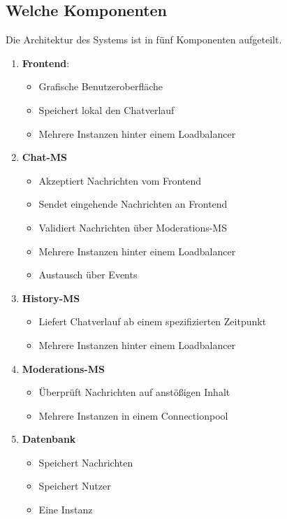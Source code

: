 \documentclass[12pt]{report}
\begin{document}
\subsection{Welche Komponenten}
Die Architektur des Systems ist in fünf Komponenten aufgeteilt. 
\begin{enumerate}
	\item \textbf{Frontend}: 
	\begin{itemize}
		\item Grafische Benutzeroberfläche
		\item Speichert lokal den Chatverlauf
		\item Mehrere Instanzen hinter einem Loadbalancer
	\end{itemize}
	\item \textbf{Chat-MS}
	\begin{itemize}
		\item Akzeptiert Nachrichten vom Frontend
		\item Sendet eingehende Nachrichten an Frontend
		\item Validiert Nachrichten über Moderations-MS
		\item Mehrere Instanzen hinter einem Loadbalancer
		\item Austausch über Events
	\end{itemize}
	\item \textbf{History-MS}
	\begin{itemize}
		\item Liefert Chatverlauf ab einem spezifizierten Zeitpunkt
		\item Mehrere Instanzen hinter einem Loadbalancer
	\end{itemize}
	\item \textbf{Moderations-MS}
	\begin{itemize}
		\item Überprüft Nachrichten auf anstößigen Inhalt
		\item Mehrere Instanzen in einem Connectionpool
	\end{itemize}
	\item \textbf{Datenbank}
	\begin{itemize}
		\item Speichert Nachrichten 
		\item Speichert Nutzer
		\item Eine Instanz
	\end{itemize}
\end{enumerate}
\end{document}
